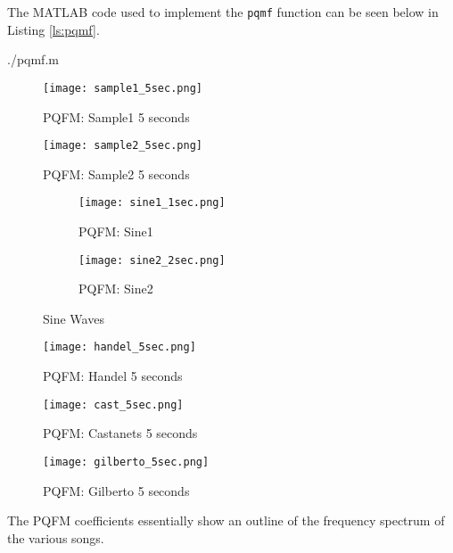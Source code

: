 \documentclass{article} %
\begin{document}
The MATLAB code used to implement the \verb|pqmf| function can be seen below
in Listing \ref{ls:pqmf}.  


{./pqmf.m} 


\begin{figure}[H]
\centering
\texttt{[image: sample1\_5sec.png]}
\caption{PQFM: Sample1 5 seconds}
\label{fig:samp1PQFM}
\end{figure}
\begin{figure}[H]
\centering
\texttt{[image: sample2\_5sec.png]}
\caption{PQFM: Sample2 5 seconds}
\label{fig:samp2PQFM}
\end{figure}

\begin{figure}[H]

\begin{subfigure}{0.5\textwidth}
\centering
\texttt{[image: sine1\_1sec.png]}
\caption{PQFM: Sine1}
\label{fig:sin1PQFM}
\end{subfigure}
\begin{subfigure}{0.5\textwidth}
\centering
\texttt{[image: sine2\_2sec.png]}
\caption{PQFM: Sine2}
\label{fig:sin2PQFM}
\end{subfigure}
\caption{Sine Waves}
\end{figure}


\begin{figure}[H]
\centering
\texttt{[image: handel\_5sec.png]}
\caption{PQFM: Handel 5 seconds}
\label{fig:handPQFM}
\end{figure}

\begin{figure}[H]
\centering
\texttt{[image: cast\_5sec.png]}
\caption{PQFM: Castanets 5 seconds}
\label{fig:castPQFM}
\end{figure}


\begin{figure}[H]
\centering
\texttt{[image: gilberto\_5sec.png]}
\caption{PQFM: Gilberto 5 seconds}
\label{fig:gilbPQFM}
\end{figure}




The PQFM coefficients essentially show an outline of the frequency
spectrum of the various songs. 
\end{document}
